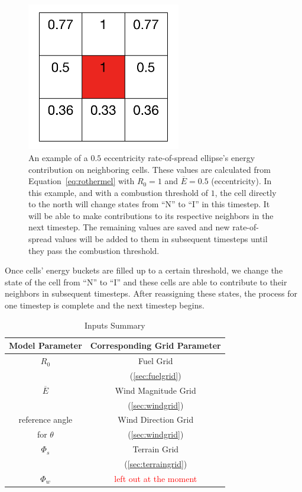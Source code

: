 \documentclass{article}
\newcommand{\note}[1]{\textcolor{red}{#1}}
\begin{document}
\begin{figure}
\centering
\includegraphics[width=0.6\textwidth]{fire_bucket_ex.png}
\caption{An example of a $0.5$ eccentricity rate-of-spread ellipse's energy contribution on neighboring cells. These values are calculated from Equation~\ref{eq:rothermel} with $R_0 = 1$ and $\overline{E} = 0.5$ (eccentricity). In this example, and with a combustion threshold of $1$, the cell directly to the north will change states from ``N'' to ``I'' in this timestep. It will be able to make contributions to its respective neighbors in the next timestep. The remaining values are saved and new rate-of-spread values will be added to them in subsequent timesteps until they pass the combustion threshold.\label{fig:buckets}}
\end{figure}

Once cells' energy buckets are filled up to a certain threshold, we change the state of the cell from ``N'' to ``I'' and these cells are able to contribute to their neighbors in subsequent timesteps. After reassigning these states, the process for one timestep is complete and the next timestep begins. 



\begin{table}[h]
\caption{Inputs Summary\label{tab:inputsummary}}
\centering
\begin{tabular}{ |c|c| } 

 \hline
 Model Parameter & Corresponding Grid Parameter \\ 
 \hline
 $R_0$ &  Fuel Grid \\ 
 		         &(\ref{sec:fuelgrid}) \\
 \hline
 $\overline{E}$ &  Wind Magnitude Grid \\ 
 				                     & (\ref{sec:windgrid}) \\
 \hline
 reference angle & Wind Direction Grid \\
 for $\theta$   & (\ref{sec:windgrid}) \\
 \hline
 $\Phi_s$ & Terrain Grid \\
                & (\ref{sec:terraingrid}) \\
  \hline
  $\Phi_w$ & \note{left out at the moment} \\
  \hline
                
  
\end{tabular}


\end{table}
\end{document}
